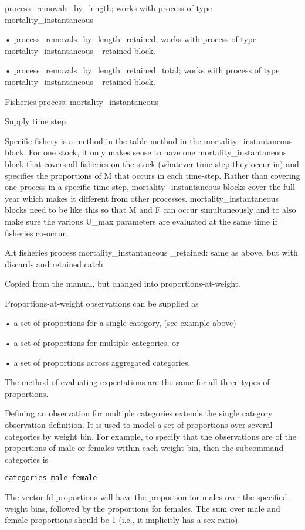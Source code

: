 \documentclass[a4paper,11pt,twoside,pdftex,draft]{article}
\begin{document}
process\_removals\_by\_length; works with process of type mortality\_instantaneous

• process\_removals\_by\_length\_retained; works with process of type mortality\_instantaneous \_retained block.

• process\_removals\_by\_length\_retained\_total; works with process of type mortality\_instantaneous \_retained block.


Fisheries process: mortality\_instantaneous

Supply time step.

Specific fishery is a method in the table method in the  mortality\_instantaneous block. For one stock, it only makes sense to have one mortality\_instantaneous block that covers all fisheries on the stock (whatever time-step they occur in) and specifies the proportions of M that occurs in each time-step. Rather than covering one process in a specific time-step, mortality\_instantaneous blocks cover the full year which makes it different from other processes. mortality\_instantaneous blocks need to be like this so that M and F can occur simultaneously and to also make sure the various U\_max parameters are evaluated at the same time if fisheries co-occur.

Alt fisheries process mortality\_instantaneous \_retained:  same as above, but with discards and retained catch

Copied from the manual, but changed into proportions-at-weight.

Proportions-at-weight observations can be supplied as

• a set of proportions for a single category, (see example above)

• a set of proportions for multiple categories, or

• a set of proportions across aggregated categories.

The method of evaluating expectations are the same for all three types of proportions.


Defining an observation for multiple categories extends the single category observation definition. It is used to model a set of proportions over several categories by weight bin. For example, to specify that the observations are of the proportions of male or females within each weight bin, then the subcommand categories is

\texttt{categories male female}

The vector fd proportions will have the proportion for males over the specified weight bins, followed by the proportions for females. The sum over male and female proportions should be 1 (i.e., it implicitly has a sex ratio).
\end{document}
